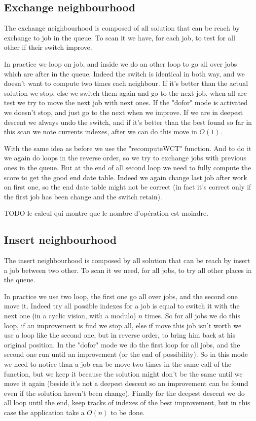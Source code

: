 \documentclass[12pt,a4paper]{article}
\begin{document}
\subsection{Exchange neighbourhood}

The exchange neighbourhood is composed of all solution that can be reach by exchange to job in the queue. To scan it we have, for each job, to test for all other if their switch improve.

In practice we loop on job, and inside we do an other loop to go all over jobs which are after in the queue. Indeed the switch is identical in both way, and we doesn't want to compute two times each neighbour. If it's better than the actual solution we stop, else we switch them again and go to the next job, when all are test we try to move the next job with next ones. If the "dofor" mode is activated we doesn't stop, and just go to the next when we improve. If we are in deepest descent we always undo the switch, and if it's better than the best found so far in this scan we note currents indexes, after we can do this move in $O(1)$.

With the same idea as before we use the "recomputeWCT" function. And to do it we again do loops in the reverse order, so we try to exchange jobs with previous ones in the queue. But at the end of all second loop we need to fully compute the score to get the good end date table. Indeed we again change last job after work on first one, so the end date table might not be correct (in fact it's correct only if the first job has been change and the switch retain).

TODO le calcul qui montre que le nombre d'opération est moindre.

\subsection{Insert neighbourhood}

The insert neighbourhood is composed by all solution that can be reach by insert a job between two other. To scan it we need, for all jobs, to try all other places in the queue.

In practice we use two loop, the first one go all over jobs, and the second one move it. Indeed try all possible indexes for a job is equal to switch it with the next one (in a cyclic vision, with a modulo) $n$ times. So for all jobs we do this loop, if an improvement is find we stop all, else if move this job isn't worth we use a loop like the second one, but in reverse order, to bring him back at his original position. In the "dofor" mode we do the first loop for all jobs, and the second one run until an improvement (or the end of possibility). So in this mode we need to notice than a job can be move two times in the same call of the function, but we keep it because the solution might don't be the same until we move it again (beside it's not a deepest descent so an improvement can be found even if the solution haven't been change). Finally for the deepest descent we do all loop until the end, keep tracks of indexes of the best improvement, but in this case the application take a $O(n)$ to be done.
\end{document}
